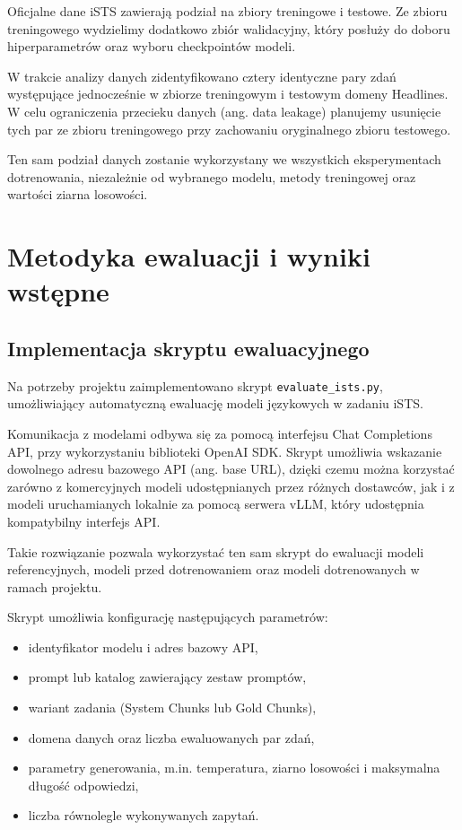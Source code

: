 \documentclass[a4paper,10pt]{article}
\begin{document}
Oficjalne dane iSTS zawierają podział na zbiory
treningowe i testowe. Ze zbioru treningowego wydzielimy
dodatkowo zbiór walidacyjny, który posłuży do doboru
hiperparametrów oraz wyboru checkpointów modeli.

W trakcie analizy danych zidentyfikowano cztery
identyczne pary zdań występujące jednocześnie
w zbiorze treningowym i testowym domeny Headlines.
W celu ograniczenia przecieku danych (ang. data leakage)
planujemy usunięcie tych par ze zbioru treningowego
przy zachowaniu oryginalnego zbioru testowego.

Ten sam podział danych zostanie wykorzystany we
wszystkich eksperymentach dotrenowania, niezależnie
od wybranego modelu, metody treningowej oraz wartości
ziarna losowości.

\section{Metodyka ewaluacji i wyniki wstępne}

\subsection{Implementacja skryptu ewaluacyjnego}

Na potrzeby projektu zaimplementowano skrypt
\texttt{evaluate\_ists.py}, umożliwiający automatyczną
ewaluację modeli językowych w zadaniu iSTS.

Komunikacja z modelami odbywa się za pomocą interfejsu
Chat Completions API, przy wykorzystaniu biblioteki
OpenAI SDK. Skrypt umożliwia wskazanie dowolnego adresu
bazowego API (ang. base URL), dzięki czemu można korzystać
zarówno z komercyjnych modeli udostępnianych przez
różnych dostawców, jak i z modeli uruchamianych lokalnie
za pomocą serwera vLLM, który udostępnia kompatybilny
interfejs API.

Takie rozwiązanie pozwala wykorzystać ten sam skrypt
do ewaluacji modeli referencyjnych, modeli przed
dotrenowaniem oraz modeli dotrenowanych w ramach
projektu.

Skrypt umożliwia konfigurację następujących parametrów:

\begin{itemize}
    \item identyfikator modelu i adres bazowy API,
    \item prompt lub katalog zawierający zestaw promptów,
    \item wariant zadania (System Chunks lub Gold Chunks),
    \item domena danych oraz liczba ewaluowanych par zdań,
    \item parametry generowania, m.in. temperatura,
    ziarno losowości i maksymalna długość odpowiedzi,
    \item liczba równolegle wykonywanych zapytań.
\end{itemize}
\end{document}
